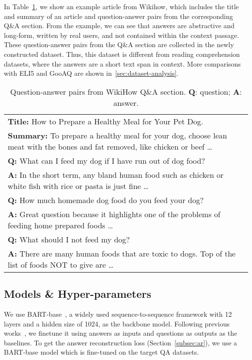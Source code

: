\documentclass[11pt]{article}
\begin{document}
In Table~\ref{tab:an-example}, we show an example article from Wikihow, which includes the title and summary of an article and question-answer pairs from the corresponding Q\&A section. From the example, we can see that answers are abstractive and long-form, written by real users, and not contained within the context passage. These question-answer pairs from the Q\&A section are collected in the newly constructed dataset. Thus, this dataset is different from reading comprehension datasets, where the answers are a short text span in context. More comparisons with ELI5 and GooAQ are shown in~\ref{sec:dataset-analysis}.
 

\begin{table}[htbp!]
\centering\small
\begin{tabular}{p{}}
\hline
\textbf{Title:} How to Prepare a Healthy Meal for Your Pet Dog. \\
\textbf{Summary:} To prepare a healthy meal for your dog, choose lean meat with the bones and fat removed, like chicken or beef \dots \\ \hline
\textbf{Q:} What can I feed my dog if I have run out of dog food? \\
\textbf{A:} In the short term, any bland human food such as chicken or white fish with rice or pasta is just fine \dots \\
\textbf{Q:} How much homemade dog food do you feed your dog? \\
\textbf{A:} Great question because it highlights one of the problems of feeding home prepared foods \dots \\
\textbf{Q:} What should I not feed my dog?  \\
\textbf{A:} There are many human foods that are toxic to dogs. Top of the list of foods NOT to give are \dots \\

\hline
\end{tabular}
\caption{Question-answer pairs from WikiHow Q\&A section. \textbf{Q}: question; \textbf{A}: answer.}
\label{tab:an-example}
\end{table}
\vspace{-0.3cm}







\subsection{Models \& Hyper-parameters}
We use BART-base~\cite{lewis-etal-2020-bart}, a widely used sequence-to-sequence framework with 12 layers and a hidden size of 1024, as the backbone model. Following previous works~\cite{fan-etal-2019-eli5,khashabi-etal-2021-gooaq-open}, we finetune it using answers as inputs and questions as outputs as the baselines. To get the answer reconstruction loss (Section~\ref{subsec:ar}), we use a BART-base model which is fine-tuned on the target QA datasets. 
\end{document}
